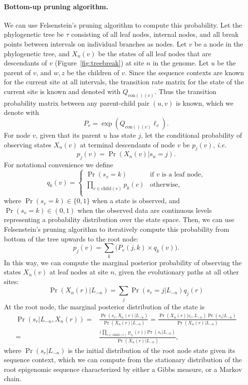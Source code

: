 \documentclass[11pt]{article}
\newcommand{\context}[1]{\ensuremath{\mathrm{con}(#1)}}
\newcommand{\child}[1]{\ensuremath{\mathrm{child}(#1)}}
\begin{document}
\paragraph{Bottom-up pruning algorithm.}
We can use Felsenstein's pruning algorithm to compute this
probability.  Let the phylogenetic tree be $\tau$ consisting of all
leaf nodes, internal nodes, and all break points between intervals on
individual branches as nodes.  Let $v$ be a node in the phylogenetic
tree, and $X_n(v)$ be the states of all leaf nodes that are
descendants of $v$ (Figure~\ref{fig:treebreak}) at site $n$ in the
genome. Let $u$ be the parent of $v$, and $w, z$ be the children of
$v$. Since the sequence contexts are known for the current site at all
intervals, the transition rate matrix for the state of the current
site is known and denoted with $Q_{\context{}(v)}$. Thus the
transition probability matrix between any parent-child pair $(u,v)$ is
known, which we denote with
\[
P_v = \exp(Q_{\context{}(v)}\ell_v).
\]
For node $v$, given that its parent $u$ has state $j$, let the
conditional probability of observing states $X_n(v)$ at
terminal descendants of node $v$ be $p_j(v)$, \textit{i.e.}
\[
p_j(v) = \Pr(X_n(v) | s_u=j).
\]
For notational convenience we define
\[
q_k(v) = \left\{
  \begin{array}{ll}
    \Pr(s_v = k) & \mbox{if $v$ is a leaf node,} \\
    \prod_{c\in \child{v}}  p_{k}(c) & \mbox{otherwise,} \\
  \end{array}\right.
\]
where $\Pr(s_v = k) \in \{0, 1\}$ when a state is observed, and
$\Pr(s_v = k) \in (0,1)$ when the observed data are continuous levels
representing a probability distribution over the state space. Then, we
can use Felsenstein's pruning algorithm to iteratively compute this probability
from bottom of the tree upwards to the root node:
\begin{equation}
  p_j(v) = \textstyle{\sum_{k}} \big(P_v(j,k) \times q_k(v)\big).
\end{equation}
In this way, we can compute the marginal posterior probability of observing the
states $X_n(v)$ at leaf nodes at site $n$, given the evolutionary
paths at all other sites:
\begin{equation}\label{eqn:leafmarginal}
\Pr(X_n(r) | L_{-n}) = \sum_j\Pr(s_r=j |L_{-n}) q_j(r)
\end{equation}
At the root node, the marginal posterior distribution of the state is
\begin{equation} \label{eqn:rootposterior}
\begin{aligned}
\Pr(s_r| L_{-n}, X_n(r)) = & \frac{\Pr(s_r, X_n(r)|L_{-n})}{\Pr(X_n(r)| L_{-n})} = \frac{\Pr(X_n(r)|s_r, L_{-n}) \Pr(s_r|L_{-n})}{\Pr(X_n(r)| L_{-n}) }  \\
= & \frac{ \big(\prod_{c\in \child{r}}  p_{s_r}(c)\big) \Pr(s_r|L_{-n})}{\Pr(X_n(r)| L_{-n}) },
\end{aligned}
\end{equation}
where $\Pr(s_r|L_{-n})$ is the initial distribution of the root node
state given its sequence context, which we can compute from the
stationary distribution of the root epigenomic sequence characterized
by either a Gibbs measure, or a Markov chain.
\end{document}
